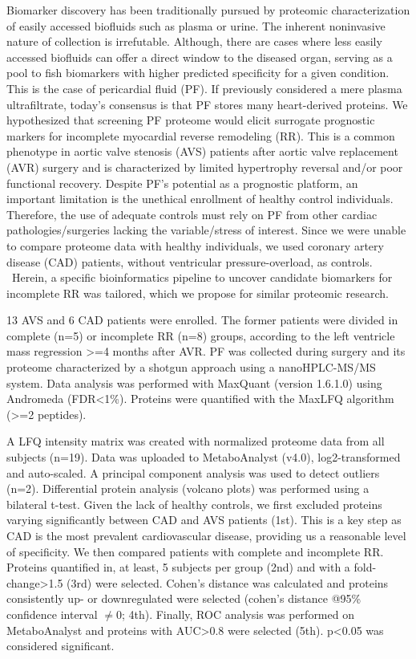 {Biomarker discovery has been traditionally pursued by proteomic characterization of easily accessed biofluids such as plasma or urine. The inherent noninvasive nature of collection is irrefutable. Although, there are cases where less easily accessed biofluids can offer a direct window to the diseased organ, serving as a pool to fish biomarkers with higher predicted specificity for a given condition. This is the case of pericardial fluid (PF). If previously considered a mere plasma ultrafiltrate, today’s consensus is that PF stores many heart-derived proteins. We hypothesized that screening PF proteome would elicit surrogate prognostic markers for incomplete myocardial reverse remodeling (RR). This is a common phenotype in aortic valve stenosis (AVS) patients after aortic valve replacement (AVR) surgery and is characterized by limited hypertrophy reversal and/or poor functional recovery. Despite PF’s potential as a prognostic platform, an important limitation is the unethical enrollment of healthy control individuals. Therefore, the use of adequate controls must rely on PF from other cardiac pathologies/surgeries lacking the variable/stress of interest. Since we were unable to compare proteome data with healthy individuals, we used coronary artery disease (CAD) patients, without ventricular pressure-overload, as controls.  Herein, a specific bioinformatics pipeline to uncover candidate biomarkers for incomplete RR was tailored, which we propose for similar proteomic research.

13 AVS and 6 CAD patients were enrolled. The former patients were divided in complete (n=5) or incomplete RR (n=8) groups, according to the left ventricle mass regression >=4 months after AVR. PF was collected during surgery and its proteome characterized by a shotgun approach using a nanoHPLC-MS/MS system. Data analysis was performed with MaxQuant (version 1.6.1.0) using Andromeda (FDR<1\%). Proteins were quantified with the MaxLFQ algorithm (>=2 peptides).

A LFQ intensity matrix was created with normalized proteome data from all subjects (n=19). Data was uploaded to MetaboAnalyst (v4.0), log2-transformed and auto-scaled. A principal component analysis was used to detect outliers (n=2). Differential protein analysis (volcano plots) was performed using a bilateral t-test. Given the lack of healthy controls, we first excluded proteins varying significantly between CAD and AVS patients (1st). This is a key step as CAD is the most prevalent cardiovascular disease, providing us a reasonable level of specificity. We then compared patients with complete and incomplete RR. Proteins quantified in, at least, 5 subjects per group (2nd) and with a fold-change>1.5 (3rd) were selected. Cohen’s distance was calculated and proteins consistently up- or downregulated were selected (cohen’s distance @95\% confidence interval $\neq$0; 4th). Finally, ROC analysis was performed on MetaboAnalyst and proteins with AUC>0.8 were selected (5th). p<0.05 was considered significant.

}

